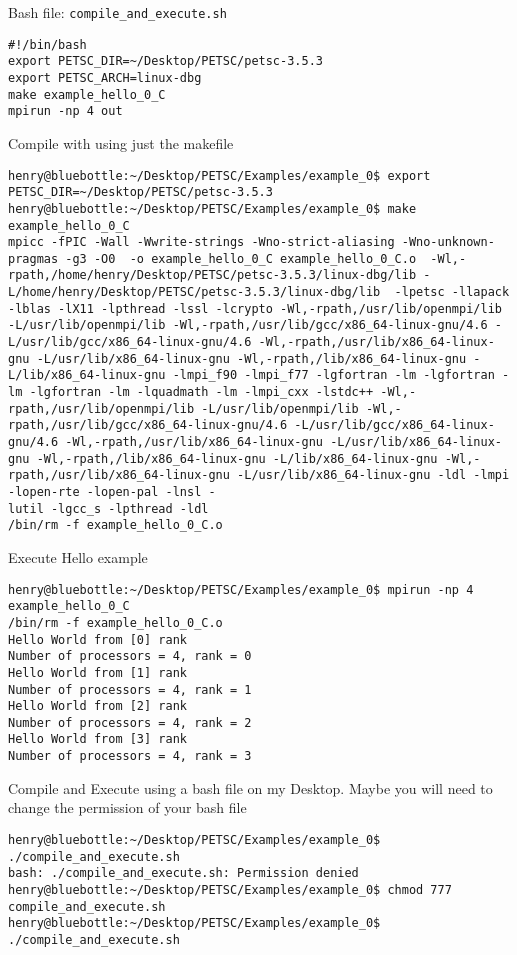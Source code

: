 \documentclass{article}
\begin{document}
Bash file: \verb+compile_and_execute.sh+
\begin{scriptsize}\begin{verbatim}
#!/bin/bash  
export PETSC_DIR=~/Desktop/PETSC/petsc-3.5.3
export PETSC_ARCH=linux-dbg
make example_hello_0_C
mpirun -np 4 out
\end{verbatim}\end{scriptsize}
Compile with using just the makefile 
\begin{scriptsize}\begin{verbatim}
henry@bluebottle:~/Desktop/PETSC/Examples/example_0$ export PETSC_DIR=~/Desktop/PETSC/petsc-3.5.3
henry@bluebottle:~/Desktop/PETSC/Examples/example_0$ make example_hello_0_C
mpicc -fPIC -Wall -Wwrite-strings -Wno-strict-aliasing -Wno-unknown-pragmas -g3 -O0  -o example_hello_0_C example_hello_0_C.o  -Wl,-rpath,/home/henry/Desktop/PETSC/petsc-3.5.3/linux-dbg/lib -L/home/henry/Desktop/PETSC/petsc-3.5.3/linux-dbg/lib  -lpetsc -llapack -lblas -lX11 -lpthread -lssl -lcrypto -Wl,-rpath,/usr/lib/openmpi/lib -L/usr/lib/openmpi/lib -Wl,-rpath,/usr/lib/gcc/x86_64-linux-gnu/4.6 -L/usr/lib/gcc/x86_64-linux-gnu/4.6 -Wl,-rpath,/usr/lib/x86_64-linux-gnu -L/usr/lib/x86_64-linux-gnu -Wl,-rpath,/lib/x86_64-linux-gnu -L/lib/x86_64-linux-gnu -lmpi_f90 -lmpi_f77 -lgfortran -lm -lgfortran -lm -lgfortran -lm -lquadmath -lm -lmpi_cxx -lstdc++ -Wl,-rpath,/usr/lib/openmpi/lib -L/usr/lib/openmpi/lib -Wl,-rpath,/usr/lib/gcc/x86_64-linux-gnu/4.6 -L/usr/lib/gcc/x86_64-linux-gnu/4.6 -Wl,-rpath,/usr/lib/x86_64-linux-gnu -L/usr/lib/x86_64-linux-gnu -Wl,-rpath,/lib/x86_64-linux-gnu -L/lib/x86_64-linux-gnu -Wl,-rpath,/usr/lib/x86_64-linux-gnu -L/usr/lib/x86_64-linux-gnu -ldl -lmpi -lopen-rte -lopen-pal -lnsl -
lutil -lgcc_s -lpthread -ldl  
/bin/rm -f example_hello_0_C.o
\end{verbatim}\end{scriptsize}
Execute Hello example
\begin{scriptsize}\begin{verbatim}
henry@bluebottle:~/Desktop/PETSC/Examples/example_0$ mpirun -np 4 example_hello_0_C
/bin/rm -f example_hello_0_C.o
Hello World from [0] rank
Number of processors = 4, rank = 0
Hello World from [1] rank
Number of processors = 4, rank = 1
Hello World from [2] rank
Number of processors = 4, rank = 2
Hello World from [3] rank
Number of processors = 4, rank = 3
\end{verbatim}\end{scriptsize}
Compile and Execute using a bash file on my Desktop. Maybe you will need to change the permission of your bash file
\begin{scriptsize}\begin{verbatim}
henry@bluebottle:~/Desktop/PETSC/Examples/example_0$ ./compile_and_execute.sh 
bash: ./compile_and_execute.sh: Permission denied
henry@bluebottle:~/Desktop/PETSC/Examples/example_0$ chmod 777 compile_and_execute.sh 
henry@bluebottle:~/Desktop/PETSC/Examples/example_0$ ./compile_and_execute.sh 
\end{verbatim}\end{scriptsize}
\end{document}
